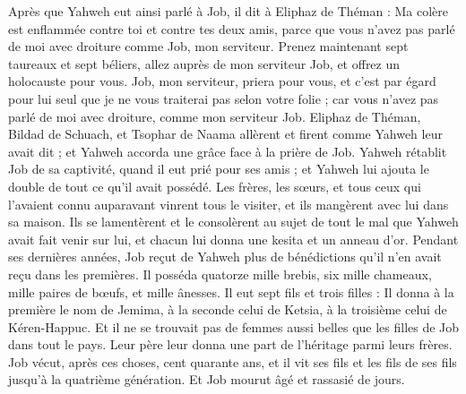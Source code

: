 \begin{multicols}{2}
Après que Yahweh eut ainsi parlé à Job, il dit à Eliphaz de Théman : Ma colère est enflammée contre toi et contre tes deux amis, parce que vous n'avez pas parlé de moi avec droiture comme Job, mon serviteur.
Prenez maintenant sept taureaux et sept béliers, allez auprès de mon serviteur Job, et offrez un holocauste pour vous. Job, mon serviteur, priera pour vous, et c'est par égard pour lui seul que je ne vous traiterai pas selon votre folie ; car vous n'avez pas parlé de moi avec droiture, comme mon serviteur Job.
Eliphaz de Théman, Bildad de Schuach, et Tsophar de Naama allèrent et firent comme Yahweh leur avait dit ; et Yahweh accorda une grâce face à la prière de Job.
Yahweh rétablit Job de sa captivité, quand il eut prié pour ses amis ; et Yahweh lui ajouta le double de tout ce qu'il avait possédé.
Les frères, les sœurs, et tous ceux qui l'avaient connu auparavant vinrent tous le visiter, et ils mangèrent avec lui dans sa maison. Ils se lamentèrent et le consolèrent au sujet de tout le mal que Yahweh avait fait venir sur lui, et chacun lui donna une kesita et un anneau d'or.
Pendant ses dernières années, Job reçut de Yahweh plus de bénédictions qu'il n'en avait reçu dans les premières. Il posséda quatorze mille brebis, six mille chameaux, mille paires de bœufs, et mille ânesses.
Il eut sept fils et trois filles :
Il donna à la première le nom de Jemima, à la seconde celui de Ketsia, à la troisième celui de Kéren-Happuc.
Et il ne se trouvait pas de femmes aussi belles que les filles de Job dans tout le pays. Leur père leur donna une part de l'héritage parmi leurs frères.
Job vécut, après ces choses, cent quarante ans, et il vit ses fils et les fils de ses fils jusqu'à la quatrième génération.
Et Job mourut âgé et rassasié de jours.
\PPE{}
\end{multicols}

